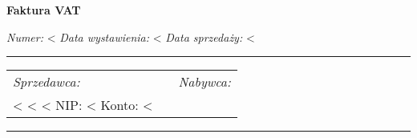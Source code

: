 \documentclass[polish]{dinbrief}
\newcommand{\lyxline}[1][1pt]{%
  \par\noindent%
  \rule[.5ex]{\linewidth}{#1}\par}
\providecommand{\tabularnewline}{\\}
\begin{document}
\begin{flushleft}
\textbf{\Large Faktura VAT}
\par\end{flushleft}{\Large \par}

\begin{flushleft}
\emph{Numer:} <%
\emph{Data wystawienia:} <%
\emph{Data sprzedaży:} <%
\par\end{flushleft}

\begin{flushleft}
\medskip{}

\par\end{flushleft}

\lyxline{\normalsize}


\begin{flushleft}
\begin{tabular}{|l|l|l|}
\cline{1-1} \cline{3-3} 
\emph{Sprzedawca:} &  & \emph{Nabywca:}\tabularnewline
\cline{1-1} \cline{3-3} 
<%
<%
<%
NIP: <%
Konto: <%
\cline{1-1} \cline{3-3} 
\end{tabular}
\par\end{flushleft}

\medskip{}

\lyxline{\normalsize}

\end{document}
